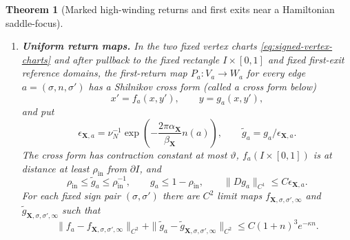 \documentclass[11pt]{amsart}
\numberwithin{equation}{section}
\newtheorem{theorem}{Theorem}[section]
\theoremstyle{definition}
\theoremstyle{remark}
\begin{document}
\begin{theorem}[Marked high-winding returns and first exits near a Hamiltonian
saddle-focus]
\begin{enumerate}
For every source sign and every $n\ge N$, both target-sign return
components are nonempty, and their common cut-face curve
$\mathcal I_{\sigma,n}$ is nonempty; equivalently,
$\mathcal G_N=\{+,-\}^2$.  For each
$\mathsf t\in\{\mathrm a,\mathrm p\}$, the interior anchor selected in
\textup{(H2)} continues into a nonempty
$E_{\mathsf t,\sigma_{\mathsf t},n,\ell_{\mathsf t}}$ for every
$n\ge N$.  No nonemptiness is asserted for every source sign or for any
other algebraic or pole cell label.

\item \textup{\textbf{Uniform return maps.}}
In the two fixed vertex charts \eqref{eq:signed-vertex-charts} and
after pullback to the fixed rectangle $I\times[0,1]$ and fixed
first-exit reference domains, the first-return map
$P_a:V_a\to W_a$ for every edge $a=(\sigma,n,\sigma')$ has a Shilnikov
cross form (called a cross form below)
\begin{equation}\label{eq:headline-cross}
 x'=f_a(x,y'),\qquad y=g_a(x,y'),
\end{equation}
and put
\begin{equation}\label{eq:headline-seam-scale}
 \epsilon_{\mathbf X,a}
 =\nu_N^{-1}\exp\!\left(
       -\frac{2\pi\alpha_{\mathbf X}}{\beta_{\mathbf X}}n(a)\right),
 \qquad \widetilde g_a=g_a/\epsilon_{\mathbf X,a}.
\end{equation}
The cross form has contraction constant at most $\vartheta$,
$f_a(I\times[0,1])$ is at distance at least $\rho_{\mathrm{in}}$ from
$\partial I$, and
\begin{equation}\label{eq:headline-seam-margin}
 \rho_{\mathrm{in}}\le\widetilde g_a\le\rho_{\mathrm{in}}^{-1},
 \qquad g_a\le1-\rho_{\mathrm{in}},
 \qquad \|Dg_a\|_{C^1}\le C\epsilon_{\mathbf X,a}.
\end{equation}
For each fixed sign pair $(\sigma,\sigma')$ there are $C^2$ limit maps
$f_{\mathbf X,\sigma,\sigma',\infty}$ and
$\widetilde g_{\mathbf X,\sigma,\sigma',\infty}$ such that
\begin{equation}\label{eq:headline-cross-limits}
 \|f_a-f_{\mathbf X,\sigma,\sigma',\infty}\|_{C^2}
 +\|\widetilde g_a-\widetilde g_{\mathbf X,\sigma,\sigma',\infty}\|_{C^2}
 \le C(1+n)^3e^{-\kappa n}.
\end{equation}

\end{enumerate}
\end{theorem}
\end{document}
